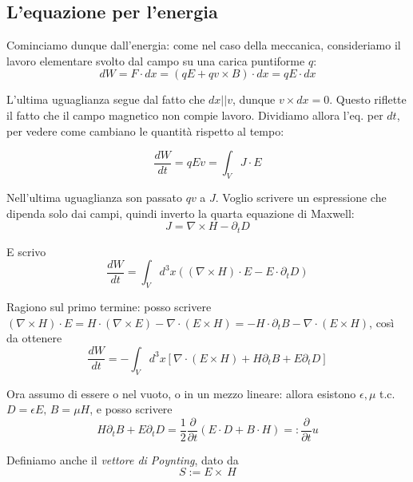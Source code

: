 \documentclass{report}
\begin{document}
\subsection{L'equazione per l'energia}

Cominciamo dunque dall'energia: come nel caso della meccanica, consideriamo il lavoro elementare svolto dal campo su una carica puntiforme $q$: 
\begin{equation}
    dW = F \cdot dx = (qE + qv\times B) \cdot dx = qE \cdot dx 
\end{equation}

L'ultima uguaglianza segue dal fatto che $dx || v$, dunque $v\times dx =0$. Questo riflette il fatto che il campo magnetico non compie lavoro. Dividiamo allora l'eq. per $dt$, per vedere come cambiano le quantità rispetto al tempo: 

\begin{equation}
    \frac{dW}{dt} = qEv = \int_V J \cdot E 
\end{equation}

Nell'ultima uguaglianza son passato $qv$ a $J$. Voglio scrivere un espressione che dipenda solo dai campi, quindi inverto la quarta equazione di Maxwell: 
\begin{equation}
    J = \nabla \times H - \partial_t D
\end{equation}

E scrivo 
\begin{equation}
    \frac{dW}{dt} = \int_Vd^3x((\nabla \times H)\cdot E - E\cdot \partial_t D)
\end{equation}

Ragiono sul primo termine: posso scrivere $(\nabla \times H)\cdot E = H \cdot (\nabla \times E) - \nabla \cdot(E \times H) = - H \cdot \partial_tB - \nabla \cdot(E \times H)$, così da ottenere 
\begin{equation}
    \frac{dW}{dt} = -\int_Vd^3x \left[ \nabla \cdot (E \times H) + H\partial_tB + E\partial_t D\right]
\end{equation}

Ora assumo di essere o nel vuoto, o in un mezzo lineare: allora esistono $\epsilon, \mu$ t.c. $D = \epsilon E, \, B = \mu H$, e posso scrivere 
\begin{equation}
    H\partial_tB + E\partial_t D = \frac{1}{2}\frac{\partial}{\partial t}\left(E\cdot D + B\cdot H \right) =: \frac{\partial}{\partial t}u
\end{equation}

Definiamo anche il \emph{vettore di Poynting}, dato da 
\begin{equation}
    S := E \times\ H
\end{equation}
\end{document}
